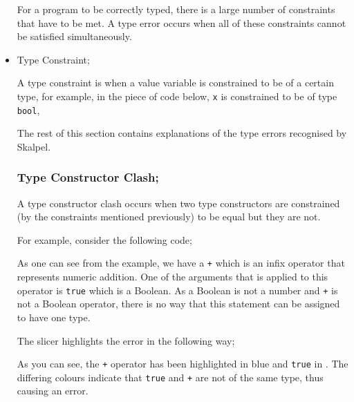 \documentclass{report}
\begin{document}
\begin{itemize}
  \subitem For a program to be correctly typed, there is a large
  number of constraints that have to be met. A type error occurs when
  all of these constraints cannot be satisfied simultaneously.



\item Type Constraint;

  \subitem A type constraint is when a value variable is constrained
  to be of a certain type, for example, in the piece of code below, \texttt{x}
  is constrained to be of type \texttt{bool},


\newpage


{\large The rest of this section contains explanations of the type errors
recognised by Skalpel.}
\vspace{0.1in}
\subsubsection{Type Constructor Clash;}

  \subitem A type constructor clash occurs when two type constructors
  are constrained (by the constraints mentioned previously) to be equal but
  they are not.

  For example, consider the following code;


As one can see from the example, we have a \texttt{+} which is
an infix operator that represents numeric addition. One of the
arguments that is applied to this operator is \texttt{true}
which is a Boolean. As a Boolean is not a number and \texttt{+}
is not a Boolean operator, there is no way that this statement can be
assigned to have one type.

The slicer highlights the error in the following way;


As you can see, the \texttt{+} operator has been highlighted in blue and
\texttt{true} in \tesEndPointOne. The differing colours indicate that
\texttt{true} and \texttt{+} are not of the same type,
thus causing an error.


\end{itemize}
\end{document}
